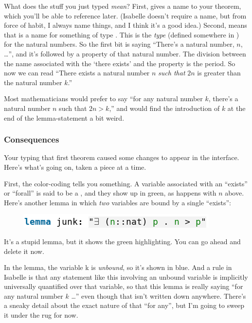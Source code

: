 What does the stuff you just typed \textit{mean}? First,  gives a name to your theorem, which you'll be able to reference later. (Isabelle doesn't require a name, but from force of habit, I always name things, and I think it's a good idea.) Second,  means that  is a name for something of type . This  is the \textit{type} (defined somewhere in ) for the natural numbers. So the first bit is saying ``There's a natural number, $n$, \ldots'', and it's followed by a property of that natural number. The division between the name associated with the `there exists' and the property is the period. So now we can read ``There exists a natural number $n$ \textit{such that} $2n$ is greater than the natural number $k$.'' 

Most mathematicians would prefer to say ``for any natural number $k$, there's a natural number $n$ such that $2n > k$,'' and would find the introduction of $k$ at the end of the lemma-statement a bit weird. 

\subsubsection{Consequences}
Your typing that first theorem caused some changes to appear in the interface. Here's what's going on, taken a piece at a time.

First, the color-coding tells you something. A variable associated with an ``exists'' or ``forall'' is said to be a , and they show up in green, as happens with $n$ above. Here's another lemma in which \textit{two} variables are bound by a single ``exists'':
\begin{figure}[h]
    \includegraphics[width=0.5\linewidth]{TEXT/C01/Images/junk-lemma.png}
\end{figure}

It's a stupid lemma, but it shows the green highlighting. You can go ahead and delete it now. 

In the  lemma, the variable k is \textit{unbound}, so it's shown in blue. And a rule in Isabelle is that any statement like this involving an unbound variable is implicitly universally quantified over that variable, so that this lemma is really saying ``for any natural number $k$ \ldots'' even though that isn't written down anywhere. There's a sneaky detail about the exact nature of that ``for any'', but I'm going to sweep it under the rug for now. 

